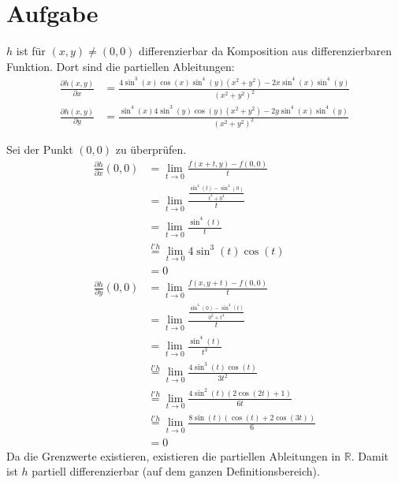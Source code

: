 \documentclass[10pt,a4paper,parskip=half]{scrartcl}
\begin{document}
\section{Aufgabe}
$h$ ist für $(x,y) \neq (0,0)$ differenzierbar da Komposition aus differenzierbaren Funktion. Dort sind die partiellen Ableitungen:
\begin{align*}
\frac{\partial h(x,y)}{\partial x} &= \frac{4\sin^3(x)\cos(x)\sin^4(y) (x^2 + y^2) - 2x\sin^4(x)\sin^4(y)}{(x^2 + y^2)^2} \\
\frac{\partial h(x,y)}{\partial y} &= \frac{\sin^4(x)4\sin^3(y)\cos(y) (x^2 + y^2) - 2y\sin^4(x)\sin^4(y)}{(x^2 + y^2)^2}
\end{align*}


Sei der Punkt $(0,0)$ zu überprüfen. 
\begin{align*}
\frac{\partial h}{\partial x}(0,0) &=  \lim_{t \to 0} \frac{f(x +t,y) - f(0,0)}{t} \\
&=  \lim_{t \to 0} \frac{\frac{\sin^4(t) - \sin^4(0)}{t^2 + 0^4}}{t} \\
&= \lim_{t \to 0} \frac{\sin^4(t)}{t} \\
&\stackrel{l'h}{=}   \lim_{t \to 0} 4\sin^3(t)\cos(t) \\
&=0 \\
\frac{\partial h}{\partial y}(0,0) &= \lim_{t \to 0} \frac{f(x,y+t) - f(0,0)}{t} \\
&=  \lim_{t \to 0} \frac{\frac{\sin^4(0) - \sin^4(t)}{0^2 + t^4}}{t} \\
&=  \lim_{t \to 0} \frac{\sin^4(t)}{t^3} \\
&\stackrel{l'h}{=}   \lim_{t \to 0} \frac{ 4\sin^3(t)\cos(t)}{3t^2} \\
&\stackrel{l'h}{=}   \lim_{t \to 0} \frac{ 4\sin^2(t)(2\cos(2t)+1)}{6t} \\
&\stackrel{l'h}{=}   \lim_{t \to 0} \frac{ 8\sin(t)(\cos(t)+2\cos(3t))}{6} \\
&= 0
\end{align*}
Da die Grenzwerte existieren, existieren die partiellen Ableitungen in $\mathbb{R}$. Damit ist $h$ partiell differenzierbar (auf dem ganzen Definitionsbereich).
\end{document}
